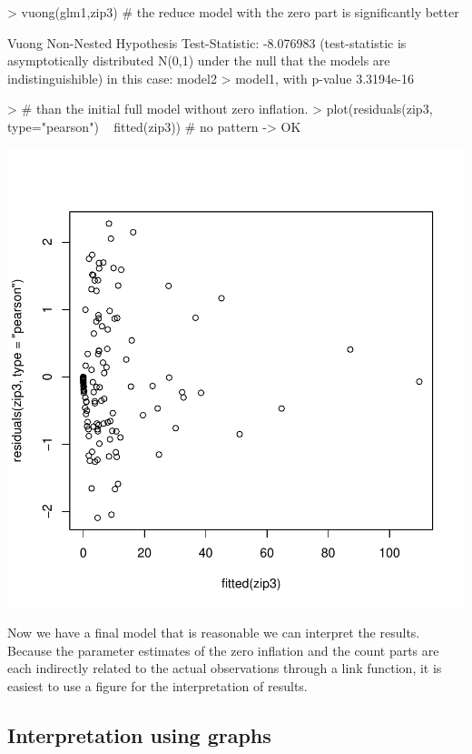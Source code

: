 \documentclass{article}
\begin{document}
\begin{Schunk}
\begin{Sinput}
> vuong(glm1,zip3) # the reduce model with the zero part is significantly better
\end{Sinput}
\begin{Soutput}
Vuong Non-Nested Hypothesis Test-Statistic: -8.076983 
(test-statistic is asymptotically distributed N(0,1) under the
 null that the models are indistinguishible)
in this case:
model2 > model1, with p-value 3.3194e-16 
\end{Soutput}
\begin{Sinput}
> # than the initial full model without zero inflation.
> plot(residuals(zip3, type="pearson") ~ fitted(zip3)) # no pattern -> OK
\end{Sinput}
\end{Schunk}
\includegraphics{HW08ZIPlogistic-val}

Now we have a final model that is reasonable we can interpret the results. Because the parameter estimates of the zero inflation and the count parts are each indirectly related to the actual observations through a link function, it is easiest to use a figure for the interpretation of results.

\subsection{Interpretation using graphs}
\end{document}
